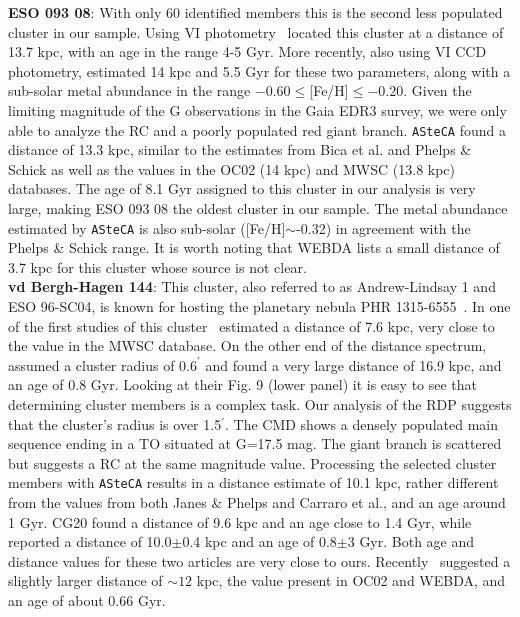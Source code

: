 \documentclass[draft]{aa}
\begin{document}
\begin{appendix}
  \noindent \textbf{ESO 093 08}: With only 60 identified members this is the second less
  populated cluster in our sample. Using VI photometry~\cite{Bica_1999} located
  this cluster at a distance of 13.7 kpc, with an age in the range 4-5 Gyr.
  More recently, also using VI CCD photometry, \cite{Phelps_2003} estimated 14
  kpc and 5.5 Gyr for these two parameters, along with a sub-solar metal
  abundance in the range $-0.60\leq$[Fe/H]$\leq-0.20$.
  Given the limiting magnitude of the G observations in the Gaia EDR3 survey, we
  were only able to analyze the RC and a poorly populated red giant branch.
  \texttt{ASteCA} found a distance of 13.3 kpc, similar to the estimates from
  Bica et al. and Phelps \& Schick as well as the values in the OC02 (14 kpc)
  and MWSC (13.8 kpc) databases.
  The age of 8.1 Gyr assigned to this cluster in our analysis is very
  large, making ESO 093 08 the oldest cluster in our sample. The metal
  abundance estimated by \texttt{ASteCA} is also sub-solar ([Fe/H]$\sim$-0.32)
  in agreement with the Phelps \& Schick range. It is worth noting that WEBDA
  lists a small distance of 3.7 kpc for this cluster whose source is not
  clear.\\

  \noindent \textbf{vd Bergh-Hagen 144}: This cluster, also referred to as Andrew-Lindsay
  1 and ESO 96-SC04, is known for hosting the planetary nebula PHR
  1315-6555~\citep{Parker_2011}.
  In one of the first studies of this cluster~\cite{Janes_1994} estimated a
  distance of 7.6 kpc, very close to the value in the MWSC database. On the
  other end of the distance spectrum,
  \cite{Carraro_2005_neglected} assumed a cluster radius of $0.6^{\prime}$ and
  found a very large distance of 16.9 kpc, and an age of 0.8 Gyr. Looking at
  their Fig. 9 (lower panel) it is easy to see that determining cluster members
  is a complex task. Our analysis of the RDP suggests that the cluster's radius
  is over 1.5$^{\prime}$. The CMD shows a densely populated main sequence ending
  in a TO situated at G=17.5 mag. The giant branch is scattered but suggests a
  RC at the same magnitude value.
  Processing the selected cluster members with \texttt{ASteCA} results in a
  distance estimate of 10.1 kpc, rather different from the values
  from both Janes \& Phelps and Carraro et al., and an age around 1 Gyr.
  CG20 found a distance of 9.6 kpc and an age close to 1.4 Gyr,
  while~\cite{Majaess_2014} reported a distance of 10.0$\pm$0.4 kpc and an
  age of 0.8$\pm$3 Gyr. Both age and distance values for these two articles are
  very close to ours. Recently~\cite{Fragkou_2019} suggested a slightly larger
  distance of $\sim12$ kpc, the value present in OC02 and WEBDA, and an age of
  about 0.66 Gyr.\\


\end{appendix}
\end{document}
